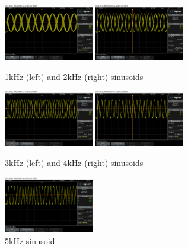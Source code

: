 \documentclass[12pt, a4paper]{article}
\begin{document}
\begin{figure} [!htb]
	\hfill\includegraphics[width=0.35\textwidth]{./Figures/Sine_1kHz}\hspace{\fill}
	\hfill\includegraphics[width=0.35\textwidth]{./Figures/Sine_2kHz}\hspace{\fill}
	\caption{1kHz (left) and 2kHz (right) sinusoids}
	\label{fig:sine1kHz2kHz}
\end{figure}

\begin{figure} [!htb]
	\hfill\includegraphics[width=0.35\textwidth]{./Figures/Sine_3kHz}\hspace{\fill}
	\hfill\includegraphics[width=0.35\textwidth]{./Figures/Sine_4kHz}\hspace{\fill}
	\caption{3kHz (left) and 4kHz (right) sinusoids}
	\label{fig:sine3kHz4kHz}
\end{figure}

\begin{figure} [!htb]
	\hfill\includegraphics[width=0.35\textwidth]{./Figures/Sine_5kHz}\hspace{\fill}
	\caption{5kHz sinusoid}
	\label{fig:sine5kHz}
\end{figure}
\pagebreak
\end{document}
